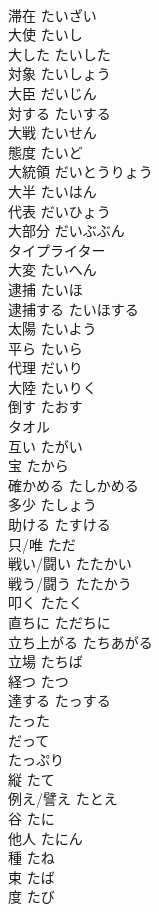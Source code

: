 \documentclass[8pt]{extreport}
\begin{document}
\begin{CJK}{UTF8}{min}
\\	滞在	たいざい	
\\	大使	たいし	
\\	大した	たいした	
\\	対象	たいしょう	
\\	大臣	だいじん	
\\	対する	たいする	
\\	大戦	たいせん	
\\	態度	たいど	
\\	大統領	だいとうりょう	
\\	大半	たいはん	
\\	代表	だいひょう	
\\	大部分	だいぶぶん	
\\	タイプライター		
\\	大変	たいへん	
\\	逮捕	たいほ	
\\	逮捕する	たいほする	
\\	太陽	たいよう	
\\	平ら	たいら	
\\	代理	だいり	
\\	大陸	たいりく	
\\	倒す	たおす	
\\	タオル		
\\	互い	たがい	
\\	宝	たから	
\\	確かめる	たしかめる	
\\	多少	たしょう	
\\	助ける	たすける	
\\	只/唯	ただ	
\\	戦い/闘い	たたかい	
\\	戦う/闘う	たたかう	
\\	叩く	たたく	
\\	直ちに	ただちに	
\\	立ち上がる	たちあがる	
\\	立場	たちば	
\\	経つ	たつ	
\\	達する	たっする	
\\	たった		
\\	だって		
\\	たっぷり		
\\	縦	たて	
\\	例え/譬え	たとえ	
\\	谷	たに	
\\	他人	たにん	
\\	種	たね	
\\	束	たば	
\\	度	たび	

\end{CJK}
\end{document}
